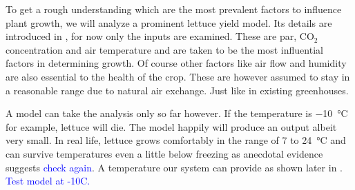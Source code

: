 To get a rough understanding which are the most prevalent factors to influence plant growth, we will analyze a prominent lettuce yield model.
Its details are introduced in , for now only the inputs are examined.
These are \ac{par}, CO$_2$ concentration and air temperature and are taken to be the most influential factors in determining growth.
Of course other factors like air flow and humidity are also essential to the health of the crop.
These are however assumed to stay in a reasonable range due to natural air exchange.
Just like in existing greenhouses.

A model can take the analysis only so far however.
If the temperature is \SI{-10}{\degreeCelsius} for example, lettuce will die.
The model happily will produce an output albeit very small.
In real life, lettuce grows comfortably in the range of 7 to \SI{24}{\degreeCelsius} and can survive temperatures even a little below freezing as anecdotal evidence suggests \textcolor{Blue}{check again}.
A temperature our system can provide as shown later in .
\textcolor{Blue}{Test model at -10C.}




